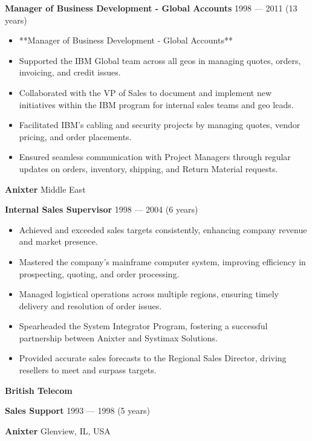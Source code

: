 \documentclass[11pt]{article}
\begin{document}
\textbf{Manager of Business Development - Global Accounts} \hfill 1998 — 2011 (13 years)
\begin{itemize}[noitemsep, topsep=0pt, partopsep=0pt, parsep=0pt]
    \item **Manager of Business Development - Global Accounts**
    \item Supported the IBM Global team across all geos in managing quotes, orders, invoicing, and credit issues.
    \item Collaborated with the VP of Sales to document and implement new initiatives within the IBM program for internal sales teams and geo leads.
    \item Facilitated IBM's cabling and security projects by managing quotes, vendor pricing, and order placements.
    \item Ensured seamless communication with Project Managers through regular updates on orders, inventory, shipping, and Return Material requests.
\end{itemize}
\vspace{8pt}
\textbf{Anixter} \hfill Middle East

\textbf{Internal Sales Supervisor} \hfill 1998 — 2004 (6 years)
\begin{itemize}[noitemsep, topsep=0pt, partopsep=0pt, parsep=0pt]
    \item Achieved and exceeded sales targets consistently, enhancing company revenue and market presence.
    \item Mastered the company’s mainframe computer system, improving efficiency in prospecting, quoting, and order processing.
    \item Managed logistical operations across multiple regions, ensuring timely delivery and resolution of order issues.
    \item Spearheaded the System Integrator Program, fostering a successful partnership between Anixter and Systimax Solutions.
    \item Provided accurate sales forecasts to the Regional Sales Director, driving resellers to meet and surpass targets.
\end{itemize}
\vspace{8pt}
\textbf{British Telecom} \hfill 

\textbf{Sales Support} \hfill 1993 — 1998 (5 years)

\vspace{8pt}
\textbf{Anixter} \hfill Glenview, IL, USA
\end{document}
